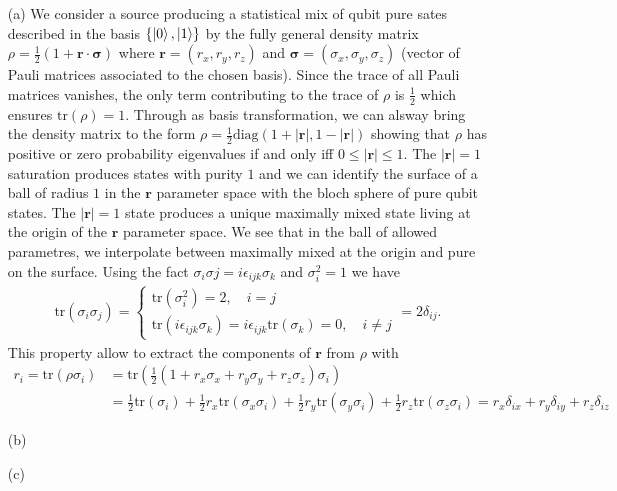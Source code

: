 \documentclass[10pt, a4paper]{article}
\begin{document}
{\begin{enumerate}
  \item[(a)] We consider a source producing a statistical mix of qubit pure sates described in the basis $\{\ket{0}, \ket{1}\}$ by the fully general density matrix $\rho = \frac{1}{2}(1 + \mathbf{r} \cdot \mathbf{\sigma})$ where $\mathbf{r} = (r_x, r_y, r_z)$ and $\mathbf{\sigma} = (\sigma_x, \sigma_y, \sigma_z)$ (vector of Pauli matrices associated to the chosen basis). Since the trace of all Pauli matrices vanishes, the only term contributing to the trace of $\rho$ is $\frac{1}{2}$ which ensures $\text{tr}(\rho) = 1$. Through as basis transformation, we can alsway bring the density matrix to the form $\rho = \frac{1}{2}\text{diag}(1+|\mathbf{r}|, 1-|\mathbf{r}|)$ showing that $\rho$ has positive or zero probability eigenvalues if and only iff $0 \leq |\mathbf{r}| \leq 1$. The $|\mathbf{r}| = 1$ saturation produces states with purity $1$ and we can identify the surface of a ball of radius $1$ in the $\mathbf{r}$ parameter space with the bloch sphere of pure qubit states. The $|\mathbf{r}| = 1$ state produces a unique maximally mixed state living at the origin of the $\mathbf{r}$ parameter space. We see that in the ball of allowed parametres, we interpolate between maximally mixed at the origin and pure on the surface. Using the fact $\sigma_{i}\sigma{j} = i \epsilon_{ijk} \sigma_k$ and $\sigma_{i}^2 = 1$ we have 
  \begin{align*}
    \text{tr}(\sigma_i \sigma_j) =
    \begin{cases}
      \text{tr}(\sigma_i^2) = 2, \quad i = j\\
      \text{tr}(i \epsilon_{ijk} \sigma_k) = i \epsilon_{ijk}\text{tr}(\sigma_k) = 0, \quad i \neq j
    \end{cases} 
    = 2 \delta_{ij}.
  \end{align*}
  This property allow to extract the components of $\mathbf{r}$ from $\rho$ with 
  \begin{align*}
    r_i = \text{tr}(\rho \sigma_i) &= \text{tr}\left(\frac{1}{2}(1 + r_x \sigma_x + r_y \sigma_y + r_z \sigma_z) \sigma_i\right)\\ &= \frac{1}{2}\text{tr}\left(\sigma_i\right) + \frac{1}{2} r_x \text{tr}\left(\sigma_x \sigma_i\right) + \frac{1}{2} r_y \text{tr}\left(\sigma_y \sigma_i\right) + \frac{1}{2} r_z \text{tr}\left(\sigma_z \sigma_i\right) = r_x \delta_{ix} + r_y \delta_{iy} + r_z \delta_{iz}
  \end{align*}
  \item[(b)]
  \item[(c)]  
\end{enumerate}

}
\end{document}
